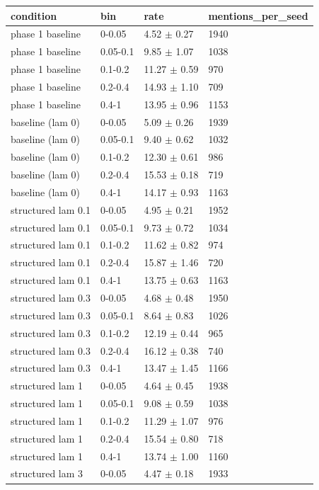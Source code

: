 \begin{tabular}{llll}
\hline
condition & bin & rate & mentions\_per\_seed \\
\hline
phase 1 baseline & 0-0.05 & 4.52 $\pm$ 0.27 & 1940 \\
phase 1 baseline & 0.05-0.1 & 9.85 $\pm$ 1.07 & 1038 \\
phase 1 baseline & 0.1-0.2 & 11.27 $\pm$ 0.59 & 970 \\
phase 1 baseline & 0.2-0.4 & 14.93 $\pm$ 1.10 & 709 \\
phase 1 baseline & 0.4-1 & 13.95 $\pm$ 0.96 & 1153 \\
baseline (lam 0) & 0-0.05 & 5.09 $\pm$ 0.26 & 1939 \\
baseline (lam 0) & 0.05-0.1 & 9.40 $\pm$ 0.62 & 1032 \\
baseline (lam 0) & 0.1-0.2 & 12.30 $\pm$ 0.61 & 986 \\
baseline (lam 0) & 0.2-0.4 & 15.53 $\pm$ 0.18 & 719 \\
baseline (lam 0) & 0.4-1 & 14.17 $\pm$ 0.93 & 1163 \\
structured lam 0.1 & 0-0.05 & 4.95 $\pm$ 0.21 & 1952 \\
structured lam 0.1 & 0.05-0.1 & 9.73 $\pm$ 0.72 & 1034 \\
structured lam 0.1 & 0.1-0.2 & 11.62 $\pm$ 0.82 & 974 \\
structured lam 0.1 & 0.2-0.4 & 15.87 $\pm$ 1.46 & 720 \\
structured lam 0.1 & 0.4-1 & 13.75 $\pm$ 0.63 & 1163 \\
structured lam 0.3 & 0-0.05 & 4.68 $\pm$ 0.48 & 1950 \\
structured lam 0.3 & 0.05-0.1 & 8.64 $\pm$ 0.83 & 1026 \\
structured lam 0.3 & 0.1-0.2 & 12.19 $\pm$ 0.44 & 965 \\
structured lam 0.3 & 0.2-0.4 & 16.12 $\pm$ 0.38 & 740 \\
structured lam 0.3 & 0.4-1 & 13.47 $\pm$ 1.45 & 1166 \\
structured lam 1 & 0-0.05 & 4.64 $\pm$ 0.45 & 1938 \\
structured lam 1 & 0.05-0.1 & 9.08 $\pm$ 0.59 & 1038 \\
structured lam 1 & 0.1-0.2 & 11.29 $\pm$ 1.07 & 976 \\
structured lam 1 & 0.2-0.4 & 15.54 $\pm$ 0.80 & 718 \\
structured lam 1 & 0.4-1 & 13.74 $\pm$ 1.00 & 1160 \\
structured lam 3 & 0-0.05 & 4.47 $\pm$ 0.18 & 1933 \\

\end{tabular}
